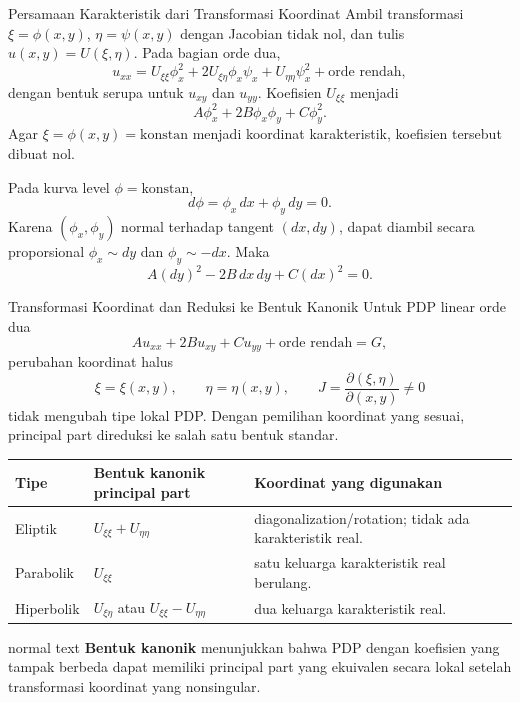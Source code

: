 \documentclass[aspectratio=169,10pt]{beamer}
\begin{document}
\begin{frame}{Persamaan Karakteristik dari Transformasi Koordinat}
\small
Ambil transformasi $\xi=\phi(x,y)$, $\eta=\psi(x,y)$ dengan Jacobian tidak nol, dan tulis $u(x,y)=U(\xi,\eta)$. Pada bagian orde dua,
\[
u_{xx}=U_{\xi\xi}\phi_x^2+2U_{\xi\eta}\phi_x\psi_x+U_{\eta\eta}\psi_x^2+\text{orde rendah},
\]
dengan bentuk serupa untuk $u_{xy}$ dan $u_{yy}$. Koefisien $U_{\xi\xi}$ menjadi
\[
A\phi_x^2+2B\phi_x\phi_y+C\phi_y^2.
\]
Agar $\xi=\phi(x,y)=\text{konstan}$ menjadi koordinat karakteristik, koefisien tersebut dibuat nol.

Pada kurva level $\phi=\text{konstan}$,
\[
d\phi=\phi_x\,dx+\phi_y\,dy=0.
\]
Karena $(\phi_x,\phi_y)$ normal terhadap tangent $(dx,dy)$, dapat diambil secara proporsional $\phi_x\sim dy$ dan $\phi_y\sim-dx$. Maka
\[
\boxed{A(dy)^2-2B\,dx\,dy+C(dx)^2=0.}
\]
\end{frame}

\begin{frame}{Transformasi Koordinat dan Reduksi ke Bentuk Kanonik}
\small
Untuk PDP linear orde dua
\[
A u_{xx}+2B u_{xy}+C u_{yy}+\text{orde rendah}=G,
\]
perubahan koordinat halus
\[
\xi=\xi(x,y),\qquad \eta=\eta(x,y),\qquad
J=\frac{\partial(\xi,\eta)}{\partial(x,y)}\neq0
\]
tidak mengubah tipe lokal PDP. Dengan pemilihan koordinat yang sesuai, principal part direduksi ke salah satu bentuk standar.

\vspace{0.06cm}
\renewcommand{\arraystretch}{1.13}
\begin{tabular}{@{}>{\raggedright\arraybackslash}p{1.9cm} >{\raggedright\arraybackslash}p{4.2cm} >{\raggedright\arraybackslash}p{5.0cm}@{}}
\toprule
\textbf{Tipe} & \textbf{Bentuk kanonik principal part} & \textbf{Koordinat yang digunakan}\\
\midrule
Eliptik & $U_{\xi\xi}+U_{\eta\eta}$ & diagonalization/rotation; tidak ada karakteristik real.\\[3pt]
Parabolik & $U_{\xi\xi}$ & satu keluarga karakteristik real berulang.\\[3pt]
Hiperbolik & $U_{\xi\eta}$ atau $U_{\xi\xi}-U_{\eta\eta}$ & dua keluarga karakteristik real.\\
\bottomrule
\end{tabular}

\vspace{0.10cm}
\begin{beamercolorbox}[sep=.09cm,wd=\textwidth]{normal text}
\centering\small
\textbf{Bentuk kanonik} menunjukkan bahwa PDP dengan koefisien yang tampak berbeda dapat memiliki principal part yang ekuivalen secara lokal setelah transformasi koordinat yang nonsingular.
\end{beamercolorbox}
\end{frame}
\end{document}
